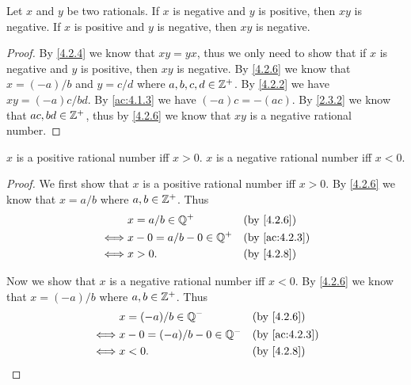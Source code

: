 \begin{ac}\label{ac:4.2.6}
  Let \(x\) and \(y\) be two rationals.
  If \(x\) is negative and \(y\) is positive, then \(xy\) is negative.
  If \(x\) is positive and \(y\) is negative, then \(xy\) is negative.
\end{ac}

\begin{proof}
  By \cref{4.2.4} we know that \(xy = yx\), thus we only need to show that if \(x\) is negative and \(y\) is positive, then \(xy\) is negative.
  By \cref{4.2.6} we know that \(x = (-a) / b\) and \(y = c / d\) where \(a, b, c, d \in \mathbb{Z}^+\).
  By \cref{4.2.2} we have \(xy = (-a)c / bd\).
  By \cref{ac:4.1.3} we have \((-a)c = -(ac)\).
  By \cref{2.3.2} we know that \(ac, bd \in \mathbb{Z}^+\), thus by \cref{4.2.6} we know that \(xy\) is a negative rational number.
\end{proof}

\begin{ac}\label{ac:4.2.7}
  \(x\) is a positive rational number iff \(x > 0\).
  \(x\) is a negative rational number iff \(x < 0\).
\end{ac}

\begin{proof}
  We first show that \(x\) is a positive rational number iff \(x > 0\).
  By \cref{4.2.6} we know that \(x = a / b\) where \(a, b \in \mathbb{Z}^+\).
  Thus
  \begin{align*}
         & x = a / b \in \Q^+         &  & \by{4.2.6}    \\
    \iff & x - 0 = a / b - 0 \in \Q^+ &  & \by{ac:4.2.3} \\
    \iff & x > 0.                     &  & \by{4.2.8}
  \end{align*}

  Now we show that \(x\) is a negative rational number iff \(x < 0\).
  By \cref{4.2.6} we know that \(x = (-a) / b\) where \(a, b \in \mathbb{Z}^+\).
  Thus
  \begin{align*}
         & x = (-a) / b \in \Q^-         &  & \by{4.2.6}    \\
    \iff & x - 0 = (-a) / b - 0 \in \Q^- &  & \by{ac:4.2.3} \\
    \iff & x < 0.                        &  & \by{4.2.8}
  \end{align*}
\end{proof}

